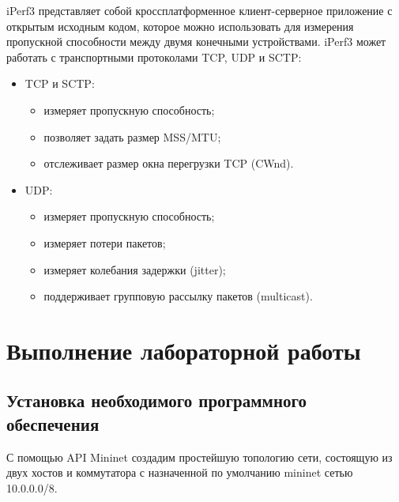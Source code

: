 \documentclass[
  english,
  russian,
  12pt,
  a4paper,
  DIV=11,
  numbers=noendperiod]{scrreprt}
\providecommand{\tightlist}{%
  \setlength{\itemsep}{0pt}\setlength{\parskip}{0pt}}
\begin{document}
iPerf3\autocite{iperf} представляет собой кроссплатформенное
клиент-серверное приложение с открытым исходным кодом, которое можно
использовать для измерения пропускной способности между двумя конечными
устройствами. iPerf3 может работать с транспортными протоколами TCP, UDP
и SCTP:

\begin{itemize}
\tightlist
\item
  TCP и SCTP:

  \begin{itemize}
  \tightlist
  \item
    измеряет пропускную способность;
  \item
    позволяет задать размер MSS/MTU;
  \item
    отслеживает размер окна перегрузки TCP (CWnd).
  \end{itemize}
\item
  UDP:

  \begin{itemize}
  \tightlist
  \item
    измеряет пропускную способность;
  \item
    измеряет потери пакетов;
  \item
    измеряет колебания задержки (jitter);
  \item
    поддерживает групповую рассылку пакетов (multicast).
  \end{itemize}
\end{itemize}

\chapter{Выполнение лабораторной
работы}\label{ux432ux44bux43fux43eux43bux43dux435ux43dux438ux435-ux43bux430ux431ux43eux440ux430ux442ux43eux440ux43dux43eux439-ux440ux430ux431ux43eux442ux44b}

\section{Установка необходимого программного
обеспечения}\label{ux443ux441ux442ux430ux43dux43eux432ux43aux430-ux43dux435ux43eux431ux445ux43eux434ux438ux43cux43eux433ux43e-ux43fux440ux43eux433ux440ux430ux43cux43cux43dux43eux433ux43e-ux43eux431ux435ux441ux43fux435ux447ux435ux43dux438ux44f}

С помощью API Mininet создадим простейшую топологию сети, состоящую из
двух хостов и коммутатора с назначенной по умолчанию mininet сетью
10.0.0.0/8.
\end{document}
